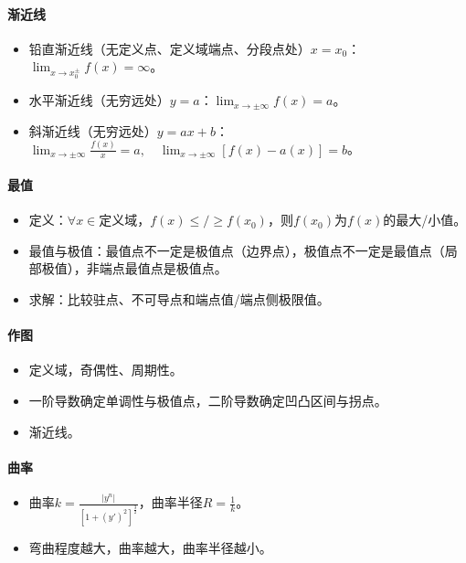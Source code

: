 \documentclass[
12pt, %
a4paper, 
oneside, %
]{scrartcl}
\begin{document}
\paragraph{渐近线}
\begin{itemize}
\item 铅直渐近线（无定义点、定义域端点、分段点处）$ x = x_0 $：$ \lim_{x \to x_0^{\pm}} f(x) = \infty $。
\item 水平渐近线（无穷远处）$ y = a $：$ \lim_{x \to \pm \infty} f(x) = a $。
\item 斜渐近线（无穷远处）$ y = ax + b $：$ \lim_{x \to \pm \infty} \frac{f(x)}{x} = a, \quad \lim_{x \to \pm \infty} [f(x) - a(x)] = b $。
\end{itemize}
\paragraph{最值}
\begin{itemize}
\item 定义：$ \forall x \in $定义域，$ f(x) \leq/\geq f(x_0) $，则$ f(x_0) $为$ f(x) $的最大/小值。
\item 最值与极值：最值点不一定是极值点（边界点），极值点不一定是最值点（局部极值），非端点最值点是极值点。
\item 求解：比较驻点、不可导点和端点值/端点侧极限值。
\end{itemize}
\paragraph{作图}
\begin{itemize}
\item 定义域，奇偶性、周期性。
\item 一阶导数确定单调性与极值点，二阶导数确定凹凸区间与拐点。
\item 渐近线。
\end{itemize}
\paragraph{曲率}
\begin{itemize}
\item 曲率$ k = \frac{|y^n|}{[1 + (y')^2]^{\frac{3}{2}}} $，曲率半径$ R = \frac{1}{k} $。
\item 弯曲程度越大，曲率越大，曲率半径越小。
\end{itemize}
\end{document}
